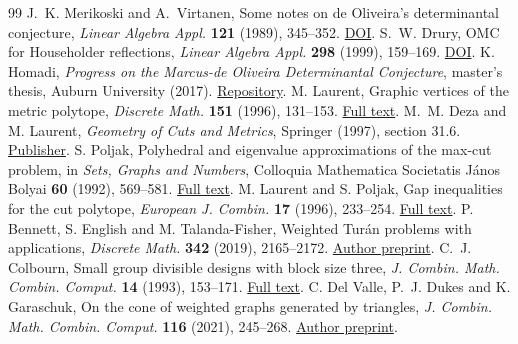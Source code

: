 \documentclass[11pt]{article}
\begin{document}
\begin{thebibliography}{99}
\small
\setlength{\itemsep}{2pt}
 J.~K. Merikoski and A.~Virtanen, Some notes on de Oliveira's determinantal conjecture, \emph{Linear Algebra Appl.} \textbf{121} (1989), 345--352. \href{https://doi.org/10.1016/0024-3795(89)90709-X}{DOI}.
 S.~W. Drury, OMC for Householder reflections, \emph{Linear Algebra Appl.} \textbf{298} (1999), 159--169. \href{https://doi.org/10.1016/S0024-3795(99)00173-1}{DOI}.
 K. Homadi, \emph{Progress on the Marcus-de Oliveira Determinantal Conjecture}, master's thesis, Auburn University (2017). \href{https://etd.auburn.edu/handle/10415/5587}{Repository}.
 M. Laurent, Graphic vertices of the metric polytope, \emph{Discrete Math.} \textbf{151} (1996), 131--153. \href{https://pure.uvt.nl/ws/portalfiles/portal/1215595/Metric.pdf}{Full text}.
 M.~M. Deza and M. Laurent, \emph{Geometry of Cuts and Metrics}, Springer (1997), section 31.6. \href{https://doi.org/10.1007/978-3-642-04295-9}{Publisher}.
 S. Poljak, Polyhedral and eigenvalue approximations of the max-cut problem, in \emph{Sets, Graphs and Numbers}, Colloquia Mathematica Societatis J\'anos Bolyai \textbf{60} (1992), 569--581. \href{https://korandi.org/docs/misc/setsgraphsnumbers/setsgraphsnumbers40.pdf}{Full text}.
 M. Laurent and S. Poljak, Gap inequalities for the cut polytope, \emph{European J. Combin.} \textbf{17} (1996), 233--254. \href{https://pure.uvt.nl/ws/portalfiles/portal/1216966/Gap.pdf}{Full text}.
 P. Bennett, S. English and M. Talanda-Fisher, Weighted Tur\'an problems with applications, \emph{Discrete Math.} \textbf{342} (2019), 2165--2172. \href{https://arxiv.org/abs/1809.05028}{Author preprint}.
 C.~J. Colbourn, Small group divisible designs with block size three, \emph{J. Combin. Math. Combin. Comput.} \textbf{14} (1993), 153--171. \href{https://combinatorialpress.com/article/jcmcc/Volume\%2014/vol-14-paper\%2012.pdf}{Full text}.
 C. Del Valle, P.~J. Dukes and K. Garaschuk, On the cone of weighted graphs generated by triangles, \emph{J. Combin. Math. Combin. Comput.} \textbf{116} (2021), 245--268. \href{https://arxiv.org/abs/1608.06017}{Author preprint}.
\end{thebibliography}
\end{document}
